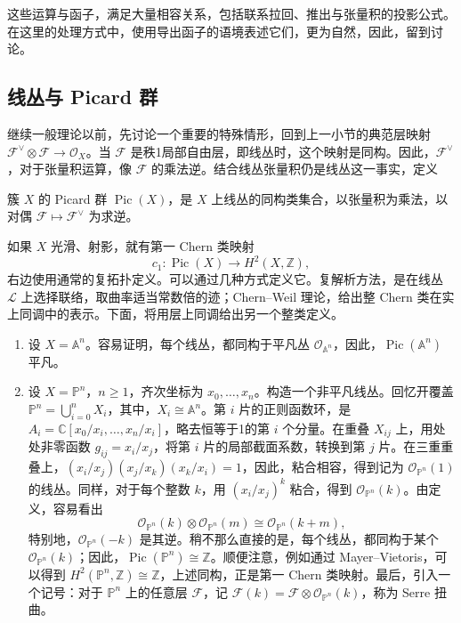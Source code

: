 这些运算与函子，满足大量相容关系，包括联系拉回、推出与张量积的投影公式。在这里的处理方式中，使用导出函子的语境表述它们，更为自然，因此，留到讨论。

\subsection{线丛与 Picard 群}\label{sec:4.3.5}

继续一般理论以前，先讨论一个重要的特殊情形，回到上一小节的典范层映射 $\mathcal{F}^{\vee}\otimes\mathcal{F}\to\mathcal{O}_X$。当 $\mathcal{F}$ 是秩1局部自由层，即线丛时，这个映射是同构。因此，$\mathcal{F}^{\vee}$，对于张量积运算，像 $\mathcal{F}$ 的乘法逆。结合线丛张量积仍是线丛这一事实，定义
\begin{definition*}\label{def:4.picard-group}
簇 $X$ 的 Picard 群 $\operatorname{Pic}(X)$，是 $X$ 上线丛的同构类集合，以张量积为乘法，以对偶 $\mathcal{F}\mapsto\mathcal{F}^{\vee}$ 为求逆。
\end{definition*}

如果 $X$ 光滑、射影，就有第一 Chern 类映射
\[
c_1\colon\operatorname{Pic}(X)\longrightarrow H^2(X,\mathbb{Z}),
\]
右边使用通常的复拓扑定义。可以通过几种方式定义它。复解析方法，是在线丛 $\mathcal{L}$ 上选择联络，取曲率适当常数倍的迹；Chern--Weil 理论，给出整 Chern 类在实上同调中的表示。下面，将用层上同调给出另一个整类定义。

\begin{example}\label{ex:4.44}
\begin{enumerate}[label=(\arabic*)]
\item 设 $X=\mathbb{A}^n$。容易证明，每个线丛，都同构于平凡丛 $\mathcal{O}_{\mathbb{A}^n}$，因此，$\operatorname{Pic}(\mathbb{A}^n)$ 平凡。
\item 设 $X=\mathbb{P}^n$，$n\ge1$，齐次坐标为 $x_0,\ldots,x_n$。构造一个非平凡线丛。回忆开覆盖 $\mathbb{P}^n=\bigcup_{i=0}^nX_i$，其中，$X_i\cong\mathbb{A}^n$。第 $i$ 片的正则函数环，是 $A_i=\mathbb{C}[x_0/x_i,\ldots,x_n/x_i]$，略去恒等于1的第 $i$ 个分量。在重叠 $X_{ij}$ 上，用处处非零函数 $g_{ij}=x_i/x_j$，将第 $i$ 片的局部截面系数，转换到第 $j$ 片。在三重重叠上，$(x_i/x_j)(x_j/x_k)(x_k/x_i)=1$，因此，粘合相容，得到记为 $\mathcal{O}_{\mathbb{P}^n}(1)$ 的线丛。同样，对于每个整数 $k$，用 $(x_i/x_j)^k$ 粘合，得到 $\mathcal{O}_{\mathbb{P}^n}(k)$。由定义，容易看出
\[
\mathcal{O}_{\mathbb{P}^n}(k)\otimes\mathcal{O}_{\mathbb{P}^n}(m)
\cong\mathcal{O}_{\mathbb{P}^n}(k+m),
\]
特别地，$\mathcal{O}_{\mathbb{P}^n}(-k)$ 是其逆。稍不那么直接的是，每个线丛，都同构于某个 $\mathcal{O}_{\mathbb{P}^n}(k)$；因此，$\operatorname{Pic}(\mathbb{P}^n)\cong\mathbb{Z}$。顺便注意，例如通过 Mayer--Vietoris，可以得到 $H^2(\mathbb{P}^n,\mathbb{Z})\cong\mathbb{Z}$，上述同构，正是第一 Chern 类映射。最后，引入一个记号：对于 $\mathbb{P}^n$ 上的任意层 $\mathcal{F}$，记 $\mathcal{F}(k)=\mathcal{F}\otimes\mathcal{O}_{\mathbb{P}^n}(k)$，称为 Serre 扭曲。
\end{enumerate}
\end{example}

